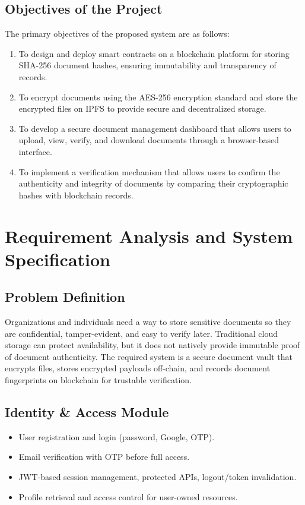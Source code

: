 \documentclass[12pt]{article}
\begin{document}
\subsection{Objectives of the Project}

The primary objectives of the proposed system are as follows:

\begin{enumerate}
\item To design and deploy smart contracts on a blockchain platform for storing SHA-256 document hashes, ensuring immutability and transparency of records.
\item To encrypt documents using the AES-256 encryption standard and store the encrypted files on IPFS to provide secure and decentralized storage.
\item To develop a secure document management dashboard that allows users to upload, view, verify, and download documents through a browser-based interface.
\item To implement a verification mechanism that allows users to confirm the authenticity and integrity of documents by comparing their cryptographic hashes with blockchain records.
\end{enumerate}\newpage
\section{Requirement Analysis and System Specification}

\subsection{Problem Definition}

Organizations and individuals need a way to store sensitive documents so they are confidential, tamper-evident, and easy to verify later. Traditional cloud storage can protect availability, but it does not natively provide immutable proof of document authenticity. The required system is a secure document vault that encrypts files, stores encrypted payloads off-chain, and records document fingerprints on blockchain for trustable verification.


\subsection{Identity \& Access Module}

\begin{itemize}
\item User registration and login (password, Google, OTP).
\item Email verification with OTP before full access.
\item JWT-based session management, protected APIs, logout/token invalidation.
\item Profile retrieval and access control for user-owned resources.
\end{itemize}
\end{document}
